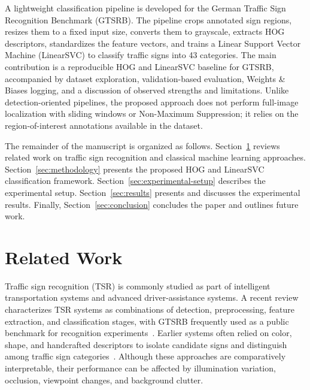 \documentclass[conference]{IEEEtran}
\begin{document}
A lightweight classification pipeline is developed for the German Traffic Sign Recognition Benchmark (GTSRB). The pipeline crops annotated sign regions, resizes them to a fixed input size, converts them to grayscale, extracts HOG descriptors, standardizes the feature vectors, and trains a Linear Support Vector Machine (LinearSVC) to classify traffic signs into 43 categories. The main contribution is a reproducible HOG and LinearSVC baseline for GTSRB, accompanied by dataset exploration, validation-based evaluation, Weights \& Biases logging, and a discussion of observed strengths and limitations. Unlike detection-oriented pipelines, the proposed approach does not perform full-image localization with sliding windows or Non-Maximum Suppression; it relies on the region-of-interest annotations available in the dataset.

The remainder of the manuscript is organized as follows. Section~\ref{sec:related-work} reviews related work on traffic sign recognition and classical machine learning approaches. Section~\ref{sec:methodology} presents the proposed HOG and LinearSVC classification framework. Section~\ref{sec:experimental-setup} describes the experimental setup. Section~\ref{sec:results} presents and discusses the experimental results. Finally, Section~\ref{sec:conclusion} concludes the paper and outlines future work.

\section{Related Work}
\label{sec:related-work}

Traffic sign recognition (TSR) is commonly studied as part of intelligent transportation systems and advanced driver-assistance systems. A recent review characterizes TSR systems as combinations of detection, preprocessing, feature extraction, and classification stages, with GTSRB frequently used as a public benchmark for recognition experiments~\cite{younes2023review}. Earlier systems often relied on color, shape, and handcrafted descriptors to isolate candidate signs and distinguish among traffic sign categories~\cite{agrawal2017moment,agrawal2017ensemble,cojocariu2018hogsvm}. Although these approaches are comparatively interpretable, their performance can be affected by illumination variation, occlusion, viewpoint changes, and background clutter.
\end{document}
